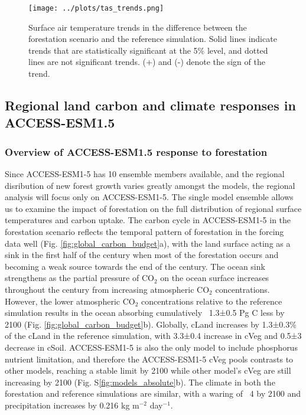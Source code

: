 \documentclass[]{article}
\begin{document}
\begin{figure}[H]
    \centering
    \texttt{[image: ../plots/tas\_trends.png]}
    \caption{Surface air temperature trends in the difference between the forestation scenario and the reference simulation. Solid lines indicate trends that are statistically significant at the 5\% level, and dotted lines are not significant trends. (+) and (-) denote the sign of the trend.}
    \label{fig:models_tas_trends}
\end{figure}

\subsection{Regional land carbon and climate responses in ACCESS-ESM1.5}

\subsubsection{Overview of ACCESS-ESM1.5 response to forestation}

Since ACCESS-ESM1-5 has 10 ensemble members available, and the regional disribution of new forest growth varies greatly amongst the models, the regional analysis will focus only on ACCESS-ESM1-5.
The single model ensemble allows us to examine the impact of forestation on the full distribution of regional surface temperatures and carbon uptake.
The carbon cycle in ACCESS-ESM1-5 in the forestation scenario reflects the temporal pattern of forestation in the forcing data well (Fig. \ref{fig:global_carbon_budget}a), with the land surface acting as a sink in the first half of the century when most of the forestation occurs and becoming a weak source towards the end of the century.
The ocean sink strengthens as the partial pressure of CO$_2$ on the ocean surface increases throughout the century from increasing atmospheric CO$_2$ concentrations.
However, the lower atmospheric CO$_2$ concentrations relative to the reference simulation results in the ocean absorbing cumulatively ~1.3±0.5 Pg C less by 2100 (Fig. \ref{fig:global_carbon_budget}b).
Globally, cLand increases by 1.3±0.3\% of the cLand in the reference simulation, with 3.3±0.4 increase in cVeg and 0.5±3 decrease in cSoil.
ACCESS-ESM1-5 is also the only model to include phosphorus nutrient limitation, and therefore the ACCESS-ESM1-5 cVeg pools contrasts to other models, reaching a stable limit by 2100 while other model's cVeg are still increasing by 2100 (Fig. S\ref{fig:models_absolute}b).
The climate in both the forestation and reference simulations are similar, with a waring of ~4 \textcelsius{} by 2100 and precipitation increases by 0.216 kg m$^{-2}$ day$^{-1}$.
\end{document}
